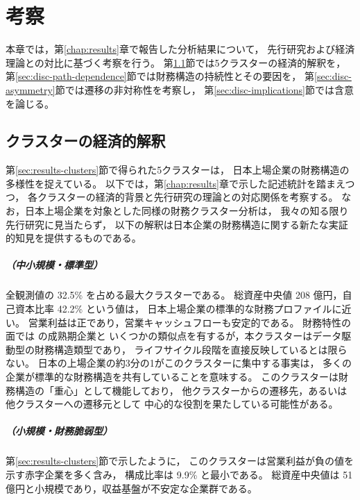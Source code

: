 \chapter{考察}
\label{chap:discussion}

本章では，第\ref{chap:results}章で報告した分析結果について，
先行研究および経済理論との対比に基づく考察を行う。
第\ref{sec:disc-clusters}節では5クラスターの経済的解釈を，
第\ref{sec:disc-path-dependence}節では財務構造の持続性とその要因を，
第\ref{sec:disc-asymmetry}節では遷移の非対称性を考察し，
第\ref{sec:disc-implications}節では含意を論じる。

\section{クラスターの経済的解釈}
\label{sec:disc-clusters}

第\ref{sec:results-clusters}節で得られた5クラスターは，
日本上場企業の財務構造の多様性を捉えている。
以下では，第\ref{chap:results}章で示した記述統計を踏まえつつ，
各クラスターの経済的背景と先行研究の理論との対応関係を考察する。
なお，日本上場企業を対象とした同様の財務クラスター分析は，
我々の知る限り先行研究に見当たらず，
以下の解釈は日本企業の財務構造に関する新たな実証的知見を提供するものである。

\paragraph{（中小規模・標準型）}
全観測値の 32.5\% を占める最大クラスターである。
総資産中央値 208 億円，自己資本比率 42.2\% という値は，
日本上場企業の標準的な財務プロファイルに近い。
営業利益は正であり，営業キャッシュフローも安定的である。
財務特性の面では  の成熟期企業と
いくつかの類似点を有するが，本クラスターはデータ駆動型の財務構造類型であり，
ライフサイクル段階を直接反映しているとは限らない。
日本の上場企業の約3分の1がこのクラスターに集中する事実は，
多くの企業が標準的な財務構造を共有していることを意味する。
このクラスターは財務構造の「重心」として機能しており，
他クラスターからの遷移先，あるいは他クラスターへの遷移元として
中心的な役割を果たしている可能性がある。

\paragraph{（小規模・財務脆弱型）}
第\ref{sec:results-clusters}節で示したように，
このクラスターは営業利益が負の値を示す赤字企業を多く含み，
構成比率は 9.9\% と最小である。
総資産中央値は 51 億円と小規模であり，収益基盤が不安定な企業群である。

